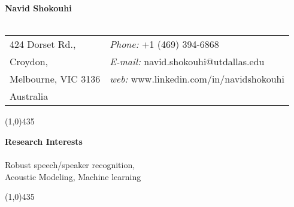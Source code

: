 \documentclass[doublespacing]{utdthesis}
\begin{document}
\begin{vita}
\newenvironment{list1}{
	\begin{list}{\ding{113}}{%
			\setlength{\itemsep}{0in}
			\setlength{\parsep}{0in} \setlength{\parskip}{0in}
			\setlength{\topsep}{0in} \setlength{\partopsep}{0in} 
			\setlength{\leftmargin}{0.17in}}}{\end{list}}
\newenvironment{list2}{
	\begin{list}{$\bullet$}{%
			\setlength{\itemsep}{0in}
			\setlength{\parsep}{0in} \setlength{\parskip}{0in}
			\setlength{\topsep}{0in} \setlength{\partopsep}{0in} 
			\setlength{\leftmargin}{0.2in}}}{\end{list}}


\textbf{\sc \bf Navid Shokouhi\\\\}
\begin{tabular}{@{}p{2.25in}p{4in}}
	424 Dorset Rd., &    {\it Phone:} +1 (469) 394-6868\\        
	Croydon, &  {\it E-mail:}  navid.shokouhi@utdallas.edu\\     
	Melbourne, VIC 3136  &  {\it web:} www.linkedin.com/in/navidshokouhi\\         
	Australia &  
	
\end{tabular}

\line(1,0){435}


\vspace{0mm}
\textbf{\sc Research Interests\\\\}
Robust speech/speaker recognition, \\
Acoustic Modeling, Machine learning

\line(1,0){435}


\end{vita}
\end{document}

